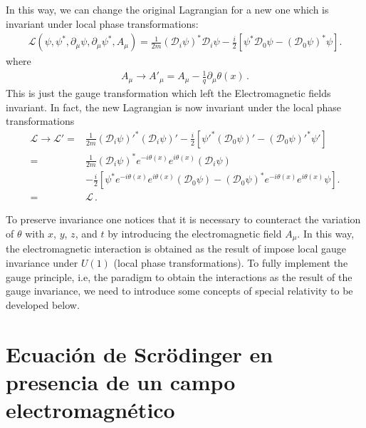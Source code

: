 In this way, we can change the original Lagrangian for a new one which is invariant under local phase transformations:
\begin{align}
   \mathcal{L}(\psi,\psi^*,\partial_\mu\psi,\partial_\mu\psi^*,A_\mu)
=\frac{1}{2m}\left(\mathcal{D}_i\psi\right)^*\mathcal{D}_i\psi-\frac{i}{2}
  \left[\psi^*\mathcal{D}_0\psi-\left(\mathcal{D}_0\psi\right)^*\psi\right].
\end{align}
where
\begin{align}
\label{eq:167qft}
  A_\mu\to A'_\mu=A_\mu-\frac{1}{q}\partial_\mu\theta(x)\,.
\end{align}
This is just the gauge transformation which left the Electromagnetic fields invariant. In fact, the new Lagrangian is now invariant under the local phase transformations
\begin{align}
  \mathcal{L}\to \mathcal{L}'=&
\frac{1}{2m}{\left(\mathcal{D}_i\psi\right)'}^*\left(\mathcal{D}_i\psi\right)'
-\frac{i}{2}\left[{\psi'}^*\left(\mathcal{D}_0\psi\right)'-{\left(\mathcal{D}_0\psi\right)'}^*\psi'\right]\nonumber\\
=&
\frac{1}{2m}{\left(\mathcal{D}_i\psi\right)}^*e^{-i\theta(x)}e^{i\theta(x)}\left(\mathcal{D}_i\psi\right)\nonumber\\
&-\frac{i}{2}\left[{\psi}^*e^{-i\theta(x)}e^{i\theta(x)}\left(\mathcal{D}_0\psi\right)
-{\left(\mathcal{D}_0\psi\right)}^*e^{-i\theta(x)}e^{i\theta(x)}\psi\right].\nonumber\\
=&\mathcal{L}\,.
\end{align}

To preserve invariance one notices that it is necessary to counteract the variation of $\theta$ with $x$, $y$, $z$, and $t$ by introducing the electromagnetic field $A_\mu$. In this way, the electromagnetic interaction is obtained as the result of impose local gauge invariance under $U(1)$ (local phase transformations). To fully implement the gauge principle, i.e, the paradigm to obtain the interactions as the result of the gauge invariance, we need to introduce some concepts of special relativity to be developed below.



\section{Ecuación de Scrödinger en presencia de un campo electromagnético}

